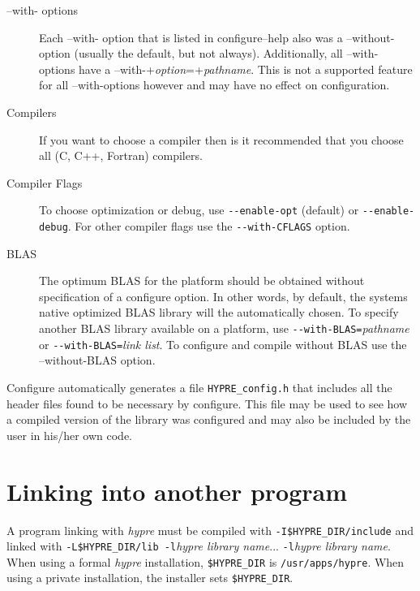 \begin{description}

\item[--with- options] Each --with- option that is listed in configure--help also was a --without- option (usually the default, but not always).  Additionally, all --with- options have a --with-+{\itshape option}=+{\itshape pathname}.  This is not a supported feature for all --with-options however and may have no effect on configuration.  

\item[Compilers] If you want to choose a compiler then is it recommended
that you choose all (C, C++, Fortran) compilers.

\item[Compiler Flags] To choose optimization or debug, use
\verb+--enable-opt+ (default) or \verb+--enable-debug+.
For other compiler flags use the \verb+--with-CFLAGS+ option.  

\item[BLAS] The optimum BLAS for the platform should be obtained
without specification of a configure option.  In other words, by default, the systems native optimized BLAS library will the automatically chosen.
To specify another BLAS library available on a
platform, use \verb+--with-BLAS=+{\itshape pathname} or
\verb+--with-BLAS=+{\itshape link list}.  To configure and compile without BLAS use the --without-BLAS option.  
\end{description}

Configure automatically generates a file \verb+HYPRE_config.h+ that
includes all the header files found to be necessary by configure.
This file may be used to see how a compiled version of the library
was configured and may also be included by the user in his/her own code.

\section{Linking into another program}

A program linking with {\slshape hypre} must be compiled with
\verb+-I$HYPRE_DIR/include+ and linked with
\verb+-L$HYPRE_DIR/lib -l+{\itshape hypre library name}... 
\verb+-l+{\itshape hypre library name}.
When using a formal {\slshape hypre} installation, \verb+$HYPRE_DIR+ is
\verb+/usr/apps/hypre+.
When using a private installation, the installer sets \verb+$HYPRE_DIR+.
